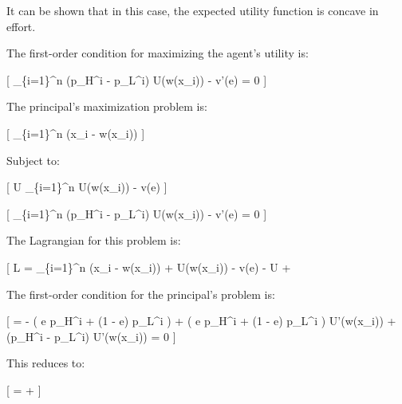 \documentclass[
  letterpaper,
  DIV=11,
  numbers=noendperiod]{scrartcl}
\begin{document}
It can be shown that in this case, the expected utility function is
concave in effort.

The first-order condition for maximizing the agent's utility is:

{[} \sum\_\{i=1\}\^{}n (p\_H\^{}i - p\_L\^{}i) U(w(x\_i)) - v'(e) = 0
{]}

The principal's maximization problem is:

{[} \max \sum\_\{i=1\}\^{}n \left[ e p_H^i + (1 - e) p_L^i \right] (x\_i
- w(x\_i)) {]}

Subject to:

{[} U \leq \sum\_\{i=1\}\^{}n
\left[ e p_H^i + (1 - e) p_L^i \right] U(w(x\_i)) - v(e) {]}

{[} \sum\_\{i=1\}\^{}n (p\_H\^{}i - p\_L\^{}i) U(w(x\_i)) - v'(e) = 0
{]}

The Lagrangian for this problem is:

{[} L = \sum\_\{i=1\}\^{}n \left[ e p_H^i + (1 - e) p_L^i \right] (x\_i
- w(x\_i)) +
\lambda \left[ \sum_{i=1}^n \left[ e p_H^i + (1 - e) p_L^i \right] U(w(x\_i))
- v(e) - U \right{]} +
\mu \left[ \sum_{i=1}^n (p_H^i - p_L^i) U(w(x_i)) - v'(e) \right]{]}

The first-order condition for the principal's problem is:

{[}  = - \left( e p\_H\^{}i + (1 - e)
p\_L\^{}i \right) + \lambda \left( e p\_H\^{}i + (1 - e) p\_L\^{}i
\right) U'(w(x\_i)) + \mu (p\_H\^{}i - p\_L\^{}i) U'(w(x\_i)) = 0 {]}

This reduces to:

{[}  = \lambda +
\mu {} {]}
\end{document}
